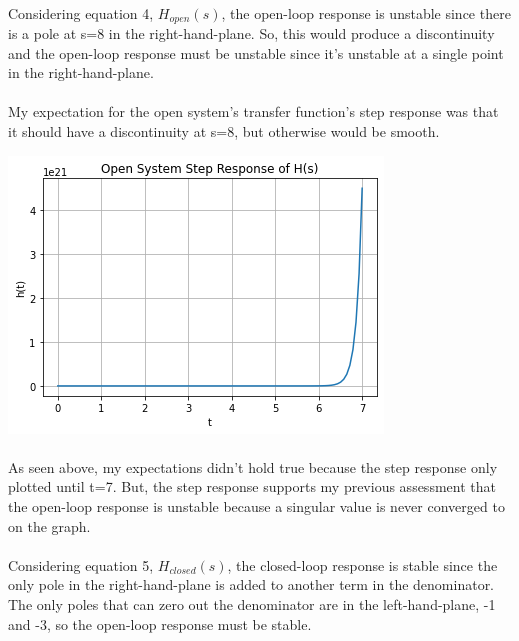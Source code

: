 \documentclass[12pt]{report}
\begin{document}
    \paragraph{} Considering equation 4, $H_{open}(s)$, the open-loop response is unstable since there is a pole at s=8 in the right-hand-plane. So, this would produce a discontinuity and the open-loop response must be unstable since it's unstable at a single point in the right-hand-plane. 
    
    \paragraph{} My expectation for the open system's transfer function's step response was that it should have a discontinuity at s=8, but otherwise would be smooth. 
    
    \includegraphics[scale=0.6]{open.png}
    
    \paragraph{} As seen above, my expectations didn't hold true because the step response only plotted until t=7. But, the step response supports my previous assessment that the open-loop response is unstable because a singular value is never converged to on the graph.   
    
    \paragraph{} Considering equation 5, $H_{closed}(s)$, the closed-loop response is stable since the only pole in the right-hand-plane is added to another term in the denominator. The only poles that can zero out the denominator are in the left-hand-plane, -1 and -3, so the open-loop response must be stable. 
    
\end{document}

